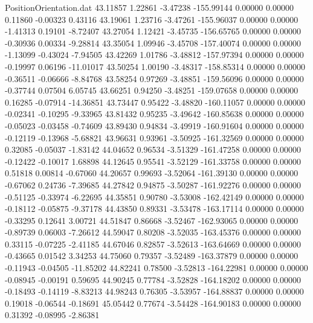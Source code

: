 \begin{filecontents}{PositionOrientation.dat}
  43.11857    1.22861   -3.47238  -155.99144    0.00000    0.00000    0.11860   -0.00323    0.43116
  43.19061    1.23716   -3.47261  -155.96037    0.00000    0.00000   -1.41313    0.19101   -8.72407
  43.27054    1.12421   -3.45735  -156.65765    0.00000    0.00000   -0.30936    0.00334   -9.28814
  43.35054    1.09946   -3.45708  -157.40074    0.00000    0.00000   -1.13099   -0.43024   -7.94505
  43.42269    1.01786   -3.48812  -157.97394    0.00000    0.00000   -0.19997    0.06196  -11.01017
  43.50254    1.00190   -3.48317  -158.85314    0.00000    0.00000   -0.36511   -0.06666   -8.84768
  43.58254    0.97269   -3.48851  -159.56096    0.00000    0.00000   -0.37744    0.07504    6.05745
  43.66251    0.94250   -3.48251  -159.07658    0.00000    0.00000    0.16285   -0.07914  -14.36851
  43.73447    0.95422   -3.48820  -160.11057    0.00000    0.00000   -0.02341   -0.10295   -9.33965
  43.81432    0.95235   -3.49642  -160.85638    0.00000    0.00000   -0.05023   -0.03458   -0.74609
  43.89430    0.94834   -3.49919  -160.91604    0.00000    0.00000   -0.12119   -0.13968   -5.68821
  43.96631    0.93961   -3.50925  -161.32569    0.00000    0.00000    0.32085   -0.05037   -1.83142
  44.04652    0.96534   -3.51329  -161.47258    0.00000    0.00000   -0.12422   -0.10017    1.68898
  44.12645    0.95541   -3.52129  -161.33758    0.00000    0.00000    0.51818    0.00814   -0.67060
  44.20657    0.99693   -3.52064  -161.39130    0.00000    0.00000   -0.67062    0.24736   -7.39685
  44.27842    0.94875   -3.50287  -161.92276    0.00000    0.00000   -0.51125   -0.33974   -6.22695
  44.35851    0.90780   -3.53008  -162.42149    0.00000    0.00000   -0.18112   -0.05875   -9.37178
  44.43850    0.89331   -3.53478  -163.17114    0.00000    0.00000   -0.33295    0.12641    3.00721
  44.51847    0.86668   -3.52467  -162.93065    0.00000    0.00000   -0.89739    0.06003   -7.26612
  44.59047    0.80208   -3.52035  -163.45376    0.00000    0.00000    0.33115   -0.07225   -2.41185
  44.67046    0.82857   -3.52613  -163.64669    0.00000    0.00000   -0.43665    0.01542    3.34253
  44.75060    0.79357   -3.52489  -163.37879    0.00000    0.00000   -0.11943   -0.04505  -11.85202
  44.82241    0.78500   -3.52813  -164.22981    0.00000    0.00000   -0.08945   -0.00191    0.59695
  44.90245    0.77784   -3.52828  -164.18202    0.00000    0.00000   -0.18493   -0.14119   -8.83213
  44.98243    0.76305   -3.53957  -164.88837    0.00000    0.00000    0.19018   -0.06544   -0.18691
  45.05442    0.77674   -3.54428  -164.90183    0.00000    0.00000    0.31392   -0.08995   -2.86381

\end{filecontents}
